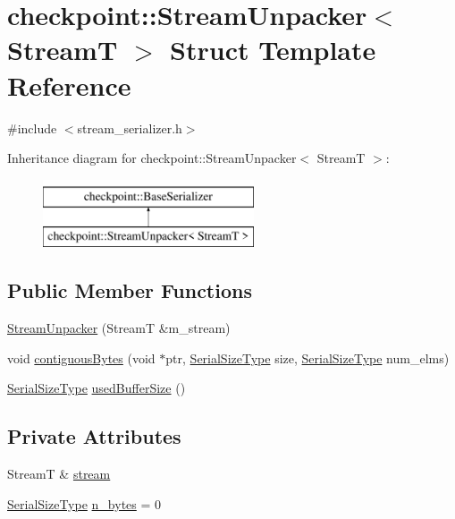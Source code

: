 \hypertarget{structcheckpoint_1_1_stream_unpacker}{}\section{checkpoint\+:\+:Stream\+Unpacker$<$ StreamT $>$ Struct Template Reference}
\label{structcheckpoint_1_1_stream_unpacker}


{\ttfamily \#include $<$stream\+\_\+serializer.\+h$>$}

Inheritance diagram for checkpoint\+:\+:Stream\+Unpacker$<$ StreamT $>$\+:\begin{figure}[H]
\begin{center}
\leavevmode
\includegraphics[height=2.000000cm]{structcheckpoint_1_1_stream_unpacker}
\end{center}
\end{figure}
\subsection*{Public Member Functions}
\begin{DoxyCompactItemize}
\item 
\hyperlink{structcheckpoint_1_1_stream_unpacker_a0908e5684a7508e57e0b662762fb8660}{Stream\+Unpacker} (StreamT \&m\+\_\+stream)
\item 
void \hyperlink{structcheckpoint_1_1_stream_unpacker_a477a4b8fdca83b480aeb821bb10b0112}{contiguous\+Bytes} (void $\ast$ptr, \hyperlink{namespacecheckpoint_a083f6674da3f94c2901b18c6d238217c}{Serial\+Size\+Type} size, \hyperlink{namespacecheckpoint_a083f6674da3f94c2901b18c6d238217c}{Serial\+Size\+Type} num\+\_\+elms)
\item 
\hyperlink{namespacecheckpoint_a083f6674da3f94c2901b18c6d238217c}{Serial\+Size\+Type} \hyperlink{structcheckpoint_1_1_stream_unpacker_a59f931c63b7a48812f45e658d789710d}{used\+Buffer\+Size} ()
\end{DoxyCompactItemize}
\subsection*{Private Attributes}
\begin{DoxyCompactItemize}
\item 
StreamT \& \hyperlink{structcheckpoint_1_1_stream_unpacker_aec9a1b42018ad4872ebd8917de9e019f}{stream}
\item 
\hyperlink{namespacecheckpoint_a083f6674da3f94c2901b18c6d238217c}{Serial\+Size\+Type} \hyperlink{structcheckpoint_1_1_stream_unpacker_a5cdef5ef87e200f57d316cf5f099bd87}{n\+\_\+bytes} = 0
\end{DoxyCompactItemize}
